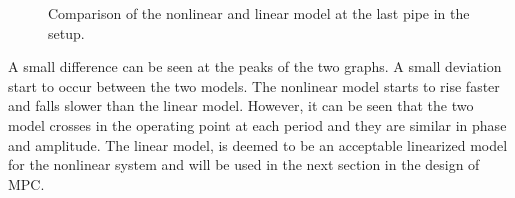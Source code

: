 \begin{figure}[H]
\centering

\caption{Comparison of the nonlinear and linear model at the last pipe in the setup.}
\label{fig:linear_nonlinear_comparison_last_pipe}
\end{figure}

A small difference can be seen at the peaks of the two graphs. A small deviation start to occur between the two models. The nonlinear model starts to rise faster and falls slower than the linear model. However, it can be seen that the two model crosses in the operating point at each period and they are similar in phase and amplitude. The linear model, is deemed to be an acceptable linearized model for the nonlinear system and will be used in the next section in the design of MPC. 